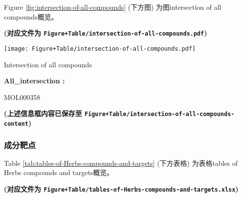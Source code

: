\documentclass[
]{article}
\begin{document}
\begin{center}\vspace{1.5cm}\end{center}

Figure \ref{fig:intersection-of-all-compounds} (下方图) 为图intersection of all compounds概览。

\textbf{(对应文件为 \texttt{Figure+Table/intersection-of-all-compounds.pdf})}

\def\@captype{figure}
\begin{center}
\texttt{[image: Figure+Table/intersection-of-all-compounds.pdf]}
\caption{Intersection of all compounds}\label{fig:intersection-of-all-compounds}
\end{center}

\begin{center}\vspace{1.5cm}\end{center}\begin{center}\begin{tcolorbox}[colback=gray!10, colframe=gray!50, width=0.9\linewidth, arc=1mm, boxrule=0.5pt]
\textbf{
All\_intersection
:}

\vspace{0.5em}

    MOL000358

\vspace{2em}
\end{tcolorbox}
\end{center}

\textbf{(上述信息框内容已保存至 \texttt{Figure+Table/intersection-of-all-compounds-content})}

\hypertarget{ux6210ux5206ux9776ux70b9}{%
\subsubsection{成分靶点}\label{ux6210ux5206ux9776ux70b9}}

\begin{center}\vspace{1.5cm}\end{center}

Table \ref{tab:tables-of-Herbs-compounds-and-targets} (下方表格) 为表格tables of Herbs compounds and targets概览。

\textbf{(对应文件为 \texttt{Figure+Table/tables-of-Herbs-compounds-and-targets.xlsx})}
\end{document}

